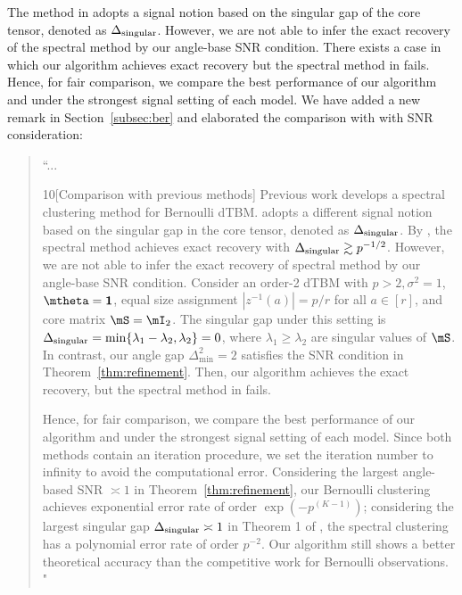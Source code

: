 \documentclass[11pt]{article}
\theoremstyle{definition}
\theoremstyle{definition}
\begin{document}
\begin{enumerate}
\begin{enumerate}[wide]
        The method in \cite{ke2019community} adopts a signal notion based on the singular gap of the core tensor, denoted as $\Delta_{\rm singular}$. However, we are not able to infer the exact recovery of the spectral method by our angle-base SNR condition. There exists a case in which our algorithm achieves exact recovery but the spectral method in \cite{ke2019community} fails. Hence, for fair comparison, we compare the best performance of our algorithm and \cite{ke2019community} under the strongest signal setting of each model. We have added a new remark in Section~\ref{subsec:ber} and elaborated the comparison with \cite{ke2019community} with SNR consideration:
        \begin{quote}
        ``...
            \begin{customrmk}{10}[Comparison with previous methods]   Previous work \citep{ke2019community} develops a spectral clustering method for Bernoulli dTBM. \cite{ke2019community} adopts a different signal notion based on the singular gap in the core tensor, denoted as $\Delta_{\rm singular}$. By \citet[Theorem 1]{ke2019community}, the spectral method achieves exact recovery with $\Delta_{\rm singular} \gtrsim p^{-1/2}$. However, we are not able to infer the exact recovery of spectral method by our angle-base SNR condition. Consider an order-2 dTBM with $p > 2, \sigma^2 = 1$, $\mtheta = \mathbf{1}$, equal size assignment $|z^{-1}(a)| = p/r$ for all $ a \in [r]$, and core matrix $\mS = \mI_2$. The singular gap under this setting is $\Delta_{\rm singular} = \min\{ \lambda_1 - \lambda_2, \lambda_2 \} = 0$, where $\lambda_1 \geq \lambda_2$ are singular values of $\mS$. In contrast, our angle gap $\Delta_{\min}^2 = 2$ satisfies the SNR condition in Theorem~\ref{thm:refinement}. Then, our algorithm achieves the exact recovery, but the spectral method in \cite{ke2019community} fails.
            
Hence, for fair comparison, we compare the best performance of our algorithm and \cite{ke2019community} under the strongest signal setting of each model. Since both methods contain an iteration procedure, we set the iteration number to infinity to avoid the computational error. Considering the largest angle-based SNR $\asymp 1$ in Theorem~\ref{thm:refinement}, our Bernoulli clustering achieves exponential error rate of order $\exp(-p^{(K-1)})$; considering the largest singular gap $\Delta_{\rm singular} \asymp 1$ in Theorem 1 of \cite{ke2019community}, the spectral clustering has a polynomial error rate of order $p^{-2}$. Our algorithm still shows a better theoretical accuracy than the competitive work for Bernoulli observations.   "
            \end{customrmk}


\end{quote}
\end{enumerate}
\end{enumerate}
\end{document}
